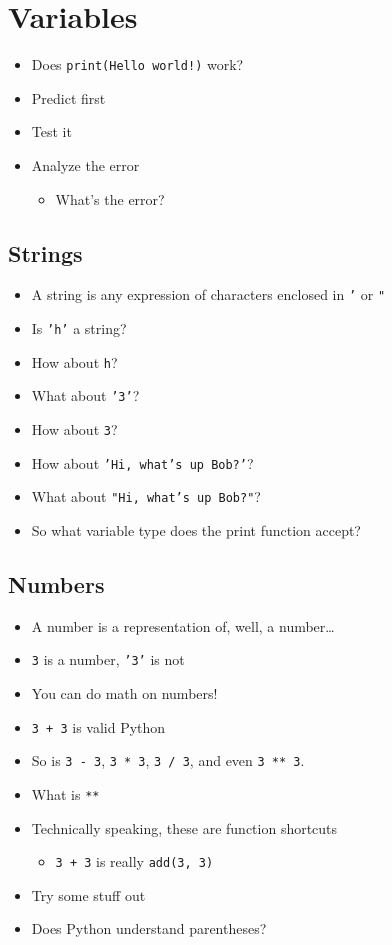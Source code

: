 \documentclass[11pt]{article}
\begin{document}
\section{Variables}
\label{sec:orgf4b47e6}
\begin{itemize}
\item Does \texttt{print(Hello world!)} work?
\item Predict first
\item Test it
\item Analyze the error
\begin{itemize}
\item What's the error?
\end{itemize}
\end{itemize}
\subsection{Strings}
\label{sec:orge54b9f8}
\begin{itemize}
\item A string is any expression of characters enclosed in \texttt{'} or \texttt{"}
\item Is \texttt{'h'} a string?
\item How about \texttt{h}?
\item What about \texttt{'3'}?
\item How about \texttt{3}?
\item How about \texttt{'Hi, what's up Bob?'}?
\item What about \texttt{"Hi, what's up Bob?"}?
\item So what variable type does the print function accept?
\end{itemize}
\subsection{Numbers}
\label{sec:org04a4fb9}
\begin{itemize}
\item A number is a representation of, well, a number\ldots{}
\item \texttt{3} is a number, \texttt{'3'} is not
\item You can do math on numbers!
\item \texttt{3 + 3} is valid Python
\item So is \texttt{3 - 3}, \texttt{3 * 3}, \texttt{3 / 3}, and even \texttt{3 ** 3}.
\item What is \texttt{**}
\item Technically speaking, these are function shortcuts
\begin{itemize}
\item \texttt{3 + 3} is really \texttt{add(3, 3)}
\end{itemize}
\item Try some stuff out
\item Does Python understand parentheses?
\end{itemize}
\end{document}
